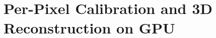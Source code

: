 \chapter{Per-Pixel Calibration and 3D Reconstruction on GPU} %
\label{chapterDataBasedCalibration} 
%
%
%


%
%
%
%
%
%
%
